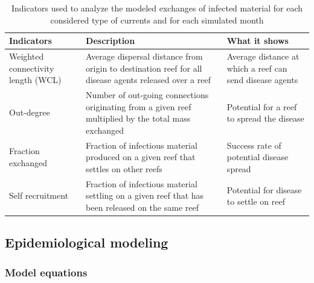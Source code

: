 \documentclass[utf8]{frontiersSCNS}
\begin{document}
\begin{table}
    \centering
    \begin{tabular}{|p{4cm}|p{5cm}|p{4cm}|}
        \hline
        \textbf{Indicators} & \textbf{Description} & \textbf{What it shows} \\
        \hline
            Weighted connectivity length (WCL) & 
            Average dispersal distance from origin to destination reef for all disease agents released over a reef & 
            Average distance at which a reef can send disease agents \\
        \hline
            Out-degree &
            Number of out-going connections originating from a given reef multiplied by the total mass exchanged  &
            Potential for a reef to spread the disease \\
        \hline
            Fraction exchanged &
            Fraction of infectious material produced on a given reef that settles on other reefs &
            Success rate of potential disease spread  \\
        \hline
            Self recruitment &
            Fraction of infectious material settling on a given reef that has been released on the same reef &
            Potential for disease to settle on reef \\
        \hline            
    \end{tabular}
    \caption{Indicators used to analyze the modeled exchanges of infected material for each considered type of currents and for each simulated month}
    \label{tab:indicator}
\end{table}

\subsection{Epidemiological modeling}

\subsubsection{Model equations}
\end{document}

